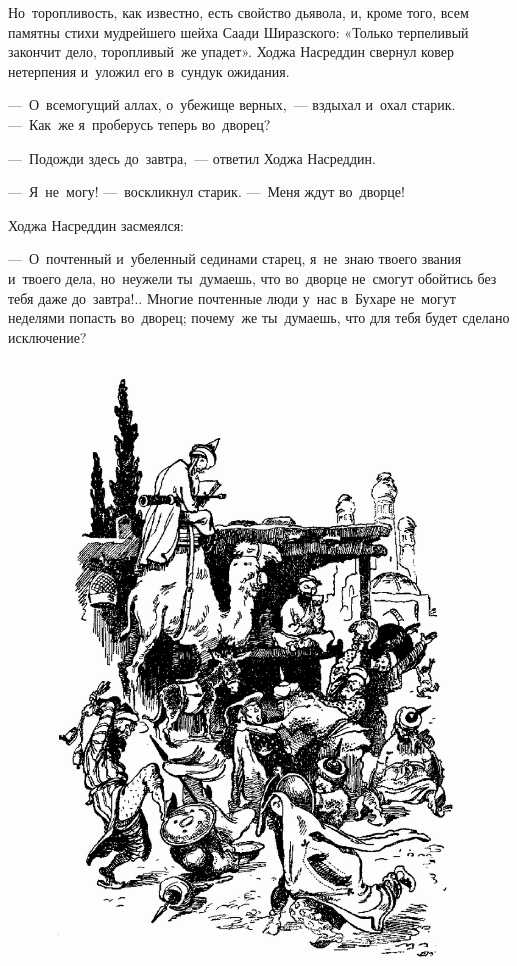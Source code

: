 \documentclass[12pt,a4paper]{book}
\begin{document}
Но~торопливость, как известно, есть свойство дьявола, и, кроме того, всем памятны стихи мудрейшего шейха Саади Ширазского: «Только терпеливый закончит дело, торопливый~же упадет». Ходжа Насреддин свернул ковер нетерпения и~уложил его в~сундук ожидания.

—~О~всемогущий аллах, о~убежище верных,~— вздыхал и~охал старик. —~Как~же я~проберусь теперь во~дворец?

—~Подожди здесь до~завтра,~— ответил Ходжа Насреддин.

—~Я~не~могу! —~воскликнул старик. —~Меня ждут во~дворце!

Ходжа Насреддин засмеялся:

—~О~почтенный и~убеленный сединами старец, я~не~знаю твоего звания и~твоего дела, но~неужели ты~думаешь, что во~дворце не~смогут обойтись без тебя даже до~завтра!.. Многие почтенные люди у~нас в~Бухаре не~могут неделями попасть во~дворец; почему~же ты~думаешь, что для тебя будет сделано исключение?

\begin{figure}[p]
\centering
\includegraphics[width=\textwidth]{12.png}
\end{figure}
\end{document}
